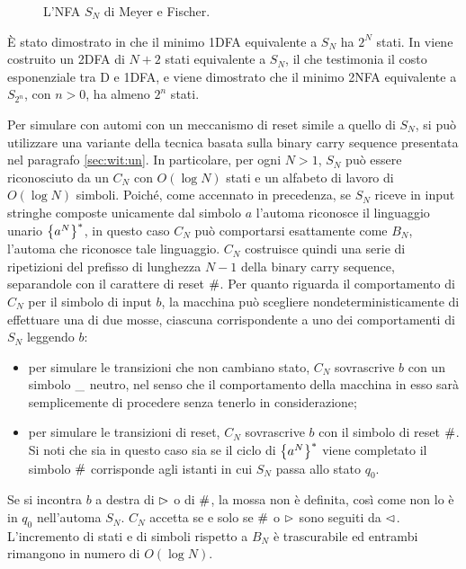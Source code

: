 \begin{figure}
	\centering
	
	\caption{L'NFA $S_N$ di Meyer e Fischer.}
	\label{img:wit:Sn}
\end{figure}

È stato dimostrato in \cite{Meyer:71:ecodescription} che il minimo 1DFA equivalente a $S_N$ ha $2^N$ stati. In \cite{Pighizzini:22:limitedwitness} viene costruito un 2DFA di $N+2$ stati equivalente a $S_N$, il che testimonia il costo esponenziale tra D e 1DFA, e viene dimostrato che il minimo 2NFA equivalente a $S_{2^n}$, con $n>0$, ha almeno $2^n$ stati.

Per simulare con  automi con un meccanismo di reset simile a quello di $S_N$, si può utilizzare una variante della tecnica basata sulla binary carry sequence presentata nel paragrafo \ref{sec:wit:un}. In particolare, per ogni $N>1$, $S_N$ può essere riconosciuto da un  $C_N$ con $O(\log N)$ stati e un alfabeto di lavoro di $O(\log N)$ simboli.
Poiché, come accennato in precedenza, se $S_N$ riceve in input stringhe composte unicamente dal simbolo $a$ l'automa riconosce il linguaggio unario $\left\{ a^N \right\}^*$, in questo caso $C_N$ può comportarsi esattamente come $B_N$, l'automa che riconosce tale linguaggio. $C_N$ costruisce quindi una serie di ripetizioni del prefisso di lunghezza $N-1$ della binary carry sequence, separandole con il carattere di reset $\#$. Per quanto riguarda il comportamento di $C_N$ per il simbolo di input $b$, la macchina può scegliere nondeterministicamente di effettuare una di due mosse, ciascuna corrispondente a uno dei comportamenti di $S_N$ leggendo $b$:
\begin{itemize}
	\item per simulare le transizioni che non cambiano stato, $C_N$ sovrascrive $b$ con un simbolo $\_$ neutro, nel senso che il comportamento della macchina in esso sarà semplicemente di procedere senza tenerlo in considerazione;
	\item per simulare le transizioni di reset, $C_N$ sovrascrive $b$ con il simbolo di reset $\#$. Si noti che sia in questo caso sia se il ciclo di $\left\{ a^N \right\}^*$ viene completato il simbolo $\#$ corrisponde agli istanti in cui $S_N$ passa allo stato $q_0$.
\end{itemize}
Se si incontra $b$ a destra di $\rhd$ o di $\#$, la mossa non è definita, così come non lo è in $q_0$ nell'automa $S_N$. $C_N$ accetta se e solo se $\#$ o $\rhd$ sono seguiti da $\lhd$. L'incremento di stati e di simboli rispetto a $B_N$ è trascurabile ed entrambi rimangono in numero di $O(\log N)$.

